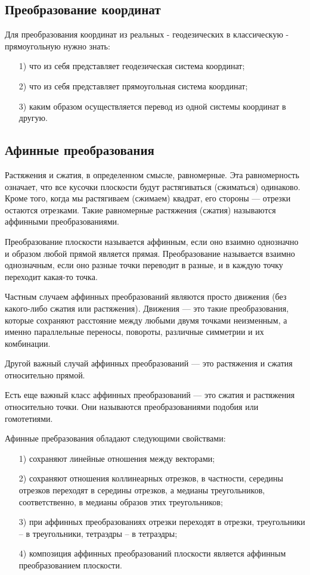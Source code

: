 \documentclass[14pt, a4paper]{extarticle}
\begin{document}
	\subsection{Преобразование координат}
	Для преобразования координат из реальных - геодезических в классическую - прямоугольную нужно знать:
	\begin{itemize}
		\item[1)] что из себя представляет геодезическая система координат;
		\item[2)] что из себя представляет прямоугольная система координат;
		\item[3)] каким образом осуществляется перевод из одной системы координат в другую.
	\end{itemize}

	\subsection{Афинные преобразования}
	Растяжения и сжатия, в определенном смысле, равномерные.	
	Эта равномерность означает, что все кусочки плоскости будут растягиваться (сжиматься) одинаково.
	Кроме того, когда мы растягиваем (сжимаем) квадрат, его стороны — отрезки остаются отрезками.	
	Такие равномерные растяжения (сжатия) называются аффинными преобразованиями.\par	
	Преобразование плоскости называется аффинным, если оно взаимно однозначно и образом любой прямой является прямая. Преобразование называется взаимно однозначным, если оно разные точки переводит в разные, и в каждую точку переходит какая-то точка.\par
	Частным случаем аффинных преобразований являются просто движения (без какого-либо сжатия или растяжения). Движения — это такие преобразования, которые сохраняют расстояние между любыми двумя точками неизменным, а именно параллельные переносы, повороты, различные симметрии и их комбинации.\par	
	Другой важный случай аффинных преобразований — это растяжения и сжатия относительно прямой.\par
	Есть еще важный класс аффинных преобразований — это сжатия и растяжения относительно точки. Они называются преобразованиями подобия или гомотетиями.
	
	Афинные пребразования обладают следующими свойствами:
	\begin{itemize}
		\item[1)] сохраняют линейные отношения между векторами;
		\item[2)] сохраняют отношения коллинеарных отрезков, 
		в частности, середины отрезков переходят в середины отрезков,
		а медианы треугольников, соответственно, в медианы образов этих треугольников;
		\item[3)] при аффинных преобразованиях отрезки
		переходят в отрезки, треугольники – в треугольники, тетраэдры – в тетраэдры;
		\item[4)] композиция аффинных преобразований плоскости
		является аффинным преобразованием плоскости.
	\end{itemize}
	
\end{document}
